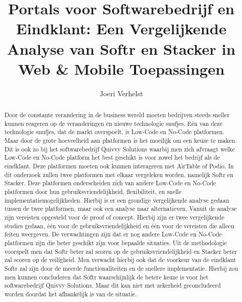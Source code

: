 \documentclass{hogent-article}
\title{Portals voor Softwarebedrijf en Eindklant: Een Vergelijkende Analyse van Softr en Stacker in Web \& Mobile Toepassingen}
\author{Joeri Verhelst}
\begin{document}
\begin{abstract}
  Door de constante verandering in de business wereld moeten bedrijven steeds sneller kunnen reageren op de veranderingen en nieuwe technologie snufjes. Eén van deze technologie snufjes, dat de markt overspoelt, is
  Low-Code en No-Code platformen. Maar door de grote hoeveelheid aan platformen is het moeilijk om een keuze te maken. Dit is ook zo bij het softwarebedrijf Quivvy Solutions waarbij men zich afvraagt welke Low-Code en No-Code platform
  het best geschikt is voor zowel het bedrijf als de eindklant. Deze platformen moeten ook kunnen interageren met AirTable of Podio. In dit onderzoek zullen twee platformen met elkaar vergeleken worden, namelijk Softr en Stacker. 
  Deze platformen onderscheiden zich van andere Low-Code en No-Code platformen door hun gebruiksvriendelijkheid, flexibiliteit, en snelle implementatiemogelijkheden.
  Hierbij is er een grondige vergelijkende analyse gedaan tussen de twee platformen, maar ook een analyse naar alternatieven. Vanuit de analyse zijn vereisten opgesteld voor de proof of concept.
  Hierbij zijn er twee vergelijkende studies gedaan, één voor de gebruiksvriendelijkheid en één voor de vereisten die alleen feiten weergeven. De verwachtingen zijn dat
  er nog andere Low-Code en No-Code platformen zijn die beter geschikt zijn voor bepaalde situaties. Uit de methodologie voorspelt men dat 
  Softr beter zal scoren op de gebruiksvriendelijkheid en Stacker beter zal scoren op de veiligheid. Men verwacht hierbij ook dat de voorkeur van de eindklant Softr zal zijn 
  door de meerde functionaliteiten en de snellere implementatie. Hierbij zou men kunnen concluderen dat Softr waarschijnlijk de betere keuze is voor het softwarebedrijf Quivvy Solutions. 
  Maar dit kan niet met zekerheid geconcludeerd worden doordat het afhankelijk is van de situatie.
\end{abstract}

\tableofcontents



\printbibliography[heading=bibintoc]
\end{document}
